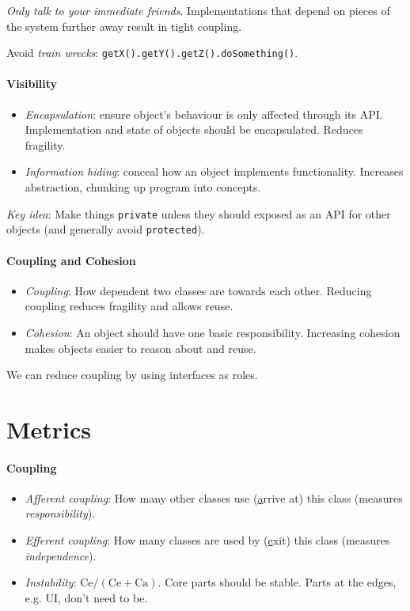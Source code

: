 \documentclass[twocolumn,english]{article}
\begin{document}
\emph{Only talk to your immediate friends}. Implementations that depend
on pieces of the system further away result in tight coupling.

Avoid \emph{train wrecks}: \texttt{getX().getY().getZ().doSomething()}.

\paragraph{Visibility}
\begin{itemize}
\item \emph{Encapsulation}: ensure object's behaviour is only affected through
its API. Implementation and state of objects should be encapsulated.
Reduces fragility.
\item \emph{Information hiding}: conceal how an object implements functionality.
Increases abstraction, chunking up program into concepts.
\end{itemize}
\emph{Key idea}: Make things \texttt{private} unless they should exposed
as an API for other objects (and generally avoid \texttt{protected}).

\paragraph{Coupling and Cohesion}
\begin{itemize}
\item \emph{Coupling}: How dependent two classes are towards each other.
Reducing coupling reduces fragility and allows reuse.
\item \emph{Cohesion}: An object should have one basic responsibility. Increasing
cohesion makes objects easier to reason about and reuse.
\end{itemize}
We can reduce coupling by using interfaces as roles.

\section{Metrics}

\paragraph{Coupling}
\begin{itemize}
\item \emph{Afferent coupling}: How many other classes use (\uline{a}rrive
at) this class (measures \emph{responsibility}).
\item \emph{Efferent coupling}: How many classes are used by (\uline{e}xit)
this class (measures \emph{independence}).
\item \emph{Instability}: $\text{Ce}/\left(\text{Ce}+\text{Ca}\right)$.
Core parts should be stable. Parts at the edges, e.g. UI, don't need
to be.
\end{itemize}
\end{document}
